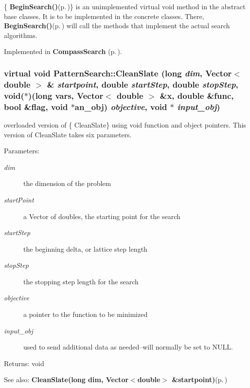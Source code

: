 \{ {\bf Begin\-Search()}{\rm (p.\,\pageref{classPatternSearch_z19_0})}\} is an unimplemented virtual void method in the abstract base classes. It is to be implemented in the concrete classes. There, {\bf Begin\-Search()}{\rm (p.\,\pageref{classPatternSearch_z19_0})} will call the methods that implement the actual search algorithms. 

Implemented in {\bf Compass\-Search} {\rm (p.\,\pageref{classCompassSearch_z5_1})}.
\subsubsection{\setlength{\rightskip}{0pt plus 5cm}virtual void Pattern\-Search::Clean\-Slate (long {\em dim}, Vector$<$ double $>$ \& {\em startpoint}, double {\em start\-Step}, double {\em stop\-Step}, void($\ast$)(long vars, Vector$<$ double $>$ \&x, double \&func, bool \&flag, void $\ast$an\_\-obj) {\em objective}, void $\ast$ {\em input\_\-obj})\hspace{0.3cm}{\tt  [virtual]}}\label{classPatternSearch_z17_2}


overloaded version of \{ Clean\-Slate\} using void function and object pointers. This version of Clean\-Slate takes six parameters. \begin{Desc}
\item[Parameters:]
\begin{description}
\item[{\em dim}]the dimension of the problem \item[{\em start\-Point}]a Vector of doubles, the starting point for the search \item[{\em start\-Step}]the beginning delta, or lattice step length \item[{\em stop\-Step}]the stopping step length for the search \item[{\em objective}]a pointer to the function to be minimized \item[{\em input\_\-obj}]used to send additional data as needed--will normally be set to NULL. \end{description}
\end{Desc}
\begin{Desc}
\item[Returns:]void \end{Desc}
\begin{Desc}
\item[See also:]{\bf Clean\-Slate(long dim, Vector$<$double$>$ \&startpoint)}{\rm (p.\,\pageref{classPatternSearch_z17_1})} \end{Desc}
